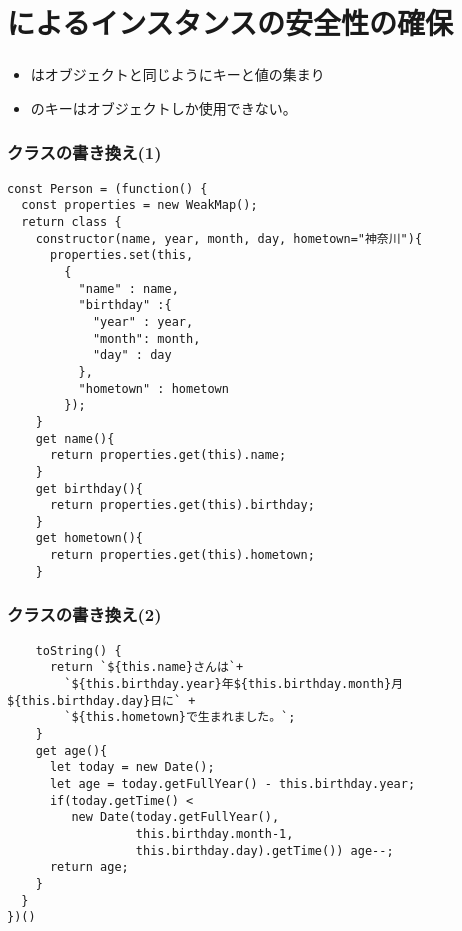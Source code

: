\section{\protect{}によるインスタンスの安全性の確保}
\begin{frame}[containsverbatim]
 \frametitle{\protect{}}
 \begin{itemize}
  \item {}はオブジェクトと同じようにキーと値の集まり
  \item {}のキーはオブジェクトしか使用できない。
 \end{itemize}
\end{frame}
\begin{frame}[containsverbatim]
 \frametitle{\protect{}クラスの書き換え(1)}
 {\scriptsize
\begin{Verbatim}
const Person = (function() {
  const properties = new WeakMap();
  return class {
    constructor(name, year, month, day, hometown="神奈川"){
      properties.set(this,
        {
          "name" : name,
          "birthday" :{
            "year" : year,
            "month": month,
            "day" : day
          },
          "hometown" : hometown
        });
    }
    get name(){
      return properties.get(this).name;
    }
    get birthday(){
      return properties.get(this).birthday;
    }
    get hometown(){
      return properties.get(this).hometown;
    }
\end{Verbatim}
 }
 \end{frame}
\begin{frame}[containsverbatim]
 \frametitle{\protect{}クラスの書き換え(2)}
 {\scriptsize
\begin{Verbatim}
    toString() {
      return `${this.name}さんは`+
        `${this.birthday.year}年${this.birthday.month}月${this.birthday.day}日に` +
        `${this.hometown}で生まれました。`;
    }
    get age(){
      let today = new Date();
      let age = today.getFullYear() - this.birthday.year;
      if(today.getTime() <
         new Date(today.getFullYear(),
                  this.birthday.month-1,
                  this.birthday.day).getTime()) age--;
      return age;
    }
  }
})()
\end{Verbatim}
 }
\end{frame}
